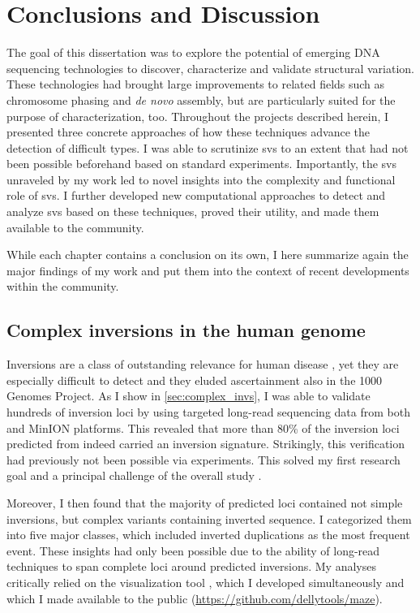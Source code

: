 \chapter{Conclusions and Discussion}
\label{sec:conclusions}

The goal of this dissertation was to explore the potential of emerging DNA
sequencing technologies to discover, characterize and validate structural
variation. These technologies had brought large improvements to related fields
such as chromosome phasing and \emph{de novo} assembly, but are particularly
suited for the purpose of \sv characterization, too.
Throughout the projects described herein, I presented three
concrete approaches of how these techniques advance the detection of difficult
\sv types. I was able to scrutinize \acp{sv} to an extent that had not been
possible beforehand based on standard \mps experiments. Importantly, the
\acp{sv} unraveled by my work led to novel insights into the complexity and
functional role
of \acp{sv}. I further developed new computational approaches to detect and
analyze \acp{sv} based on these techniques, proved their utility, and made
them available to the community.

While each chapter contains a conclusion on its own, I here summarize again the
major findings of my work and put them into the context of recent developments
within the community.



\section{Complex inversions in the human genome}

Inversions are a \sv class of outstanding relevance for human disease \citep{Feuk2010},
yet they are especially difficult to detect and they eluded ascertainment also
in the 1000 Genomes Project. As I show in \cref{sec:complex_invs}, I was able to
validate hundreds of inversion loci by using targeted long-read sequencing data
from both \pacbio and \ont MinION platforms. This revealed that more than 80\% of the
inversion loci predicted from \mps indeed carried an inversion signature.
Strikingly, this verification had previously not been possible via \pcr
experiments.  This solved my first research goal and a principal
challenge of the overall study \citep{Sudmant2015}.

Moreover, I then found that the majority of predicted loci contained not simple
inversions, but complex variants containing inverted sequence. I categorized them into five major
classes, which included inverted duplications as the most frequent event. These
insights had only been possible due to the ability of long-read techniques to
span complete loci around predicted inversions. My analyses critically relied on
the visualization tool \maze, which I developed simultaneously and which I made
available to the public (\url{https://github.com/dellytools/maze}).

